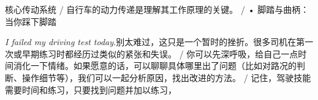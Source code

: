 \begin{multicols}{2}
核\allowbreak{}心\allowbreak{}传\allowbreak{}动\allowbreak{}系\allowbreak{}统\allowbreak{} / 自\allowbreak{}行\allowbreak{}车\allowbreak{}的\allowbreak{}动\allowbreak{}力\allowbreak{}传\allowbreak{}递\allowbreak{}是\allowbreak{}理\allowbreak{}解\allowbreak{}其\allowbreak{}工\allowbreak{}作\allowbreak{}原\allowbreak{}理\allowbreak{}的\allowbreak{}关\allowbreak{}键\allowbreak{}。\allowbreak{} / • 脚\allowbreak{}踏\allowbreak{}与\allowbreak{}曲\allowbreak{}柄\allowbreak{}：\allowbreak{}当\allowbreak{}你\allowbreak{}踩\allowbreak{}下\allowbreak{}脚\allowbreak{}踏\allowbreak{}\par\noindent\textit{I failed my driving test today.}\enspace 别\allowbreak{}太\allowbreak{}难\allowbreak{}过\allowbreak{}，\allowbreak{}这\allowbreak{}只\allowbreak{}是\allowbreak{}一\allowbreak{}个\allowbreak{}\allowbreak{}暂\allowbreak{}时\allowbreak{}的\allowbreak{}挫\allowbreak{}折\allowbreak{}。\allowbreak{}很\allowbreak{}多\allowbreak{}司\allowbreak{}机\allowbreak{}\allowbreak{}在\allowbreak{}第\allowbreak{}一\allowbreak{}次\allowbreak{}或\allowbreak{}早\allowbreak{}期\allowbreak{}练\allowbreak{}习\allowbreak{}时\allowbreak{}\allowbreak{}都\allowbreak{}经\allowbreak{}历\allowbreak{}过\allowbreak{}类\allowbreak{}似\allowbreak{}的\allowbreak{}紧\allowbreak{}张\allowbreak{}和\allowbreak{}\allowbreak{}失\allowbreak{}误\allowbreak{}。\allowbreak{} / 你\allowbreak{}可\allowbreak{}以\allowbreak{}先\allowbreak{}深\allowbreak{}呼\allowbreak{}吸\allowbreak{}，\allowbreak{}给\allowbreak{}自\allowbreak{}\allowbreak{}己\allowbreak{}一\allowbreak{}点\allowbreak{}时\allowbreak{}间\allowbreak{}消\allowbreak{}化\allowbreak{}一\allowbreak{}下\allowbreak{}情\allowbreak{}\allowbreak{}绪\allowbreak{}。\allowbreak{}如\allowbreak{}果\allowbreak{}愿\allowbreak{}意\allowbreak{}的\allowbreak{}话\allowbreak{}，\allowbreak{}可\allowbreak{}\allowbreak{}以\allowbreak{}聊\allowbreak{}聊\allowbreak{}具\allowbreak{}体\allowbreak{}哪\allowbreak{}里\allowbreak{}出\allowbreak{}了\allowbreak{}问\allowbreak{}\allowbreak{}题\allowbreak{}（\allowbreak{}比\allowbreak{}如\allowbreak{}对\allowbreak{}路\allowbreak{}况\allowbreak{}的\allowbreak{}判\allowbreak{}断\allowbreak{}\allowbreak{}、\allowbreak{}操\allowbreak{}作\allowbreak{}细\allowbreak{}节\allowbreak{}等\allowbreak{}）\allowbreak{}，\allowbreak{}我\allowbreak{}们\allowbreak{}\allowbreak{}可\allowbreak{}以\allowbreak{}一\allowbreak{}起\allowbreak{}分\allowbreak{}析\allowbreak{}原\allowbreak{}因\allowbreak{}，\allowbreak{}找\allowbreak{}\allowbreak{}出\allowbreak{}改\allowbreak{}进\allowbreak{}的\allowbreak{}方\allowbreak{}法\allowbreak{}。\allowbreak{} / 记\allowbreak{}住\allowbreak{}，\allowbreak{}驾\allowbreak{}驶\allowbreak{}技\allowbreak{}能\allowbreak{}需\allowbreak{}要\allowbreak{}时\allowbreak{}\allowbreak{}间\allowbreak{}和\allowbreak{}练\allowbreak{}习\allowbreak{}，\allowbreak{}只\allowbreak{}要\allowbreak{}找\allowbreak{}到\allowbreak{}问\allowbreak{}\allowbreak{}题\allowbreak{}并\allowbreak{}加\allowbreak{}以\allowbreak{}练\allowbreak{}习\allowbreak{}，\allowbreak{}\par\medskip

\end{multicols}
